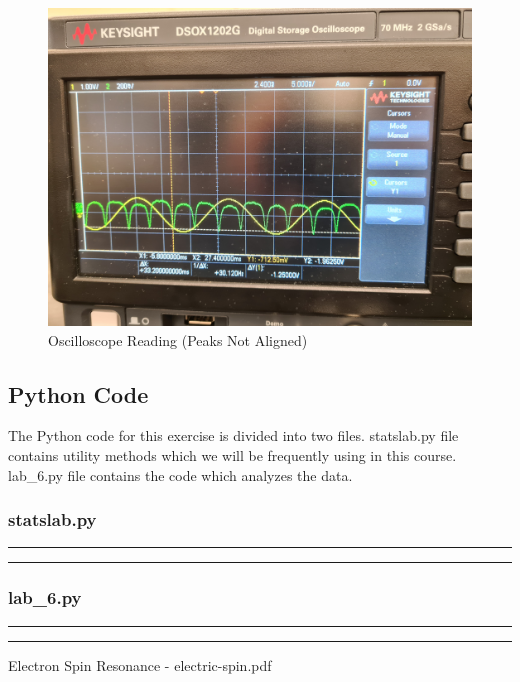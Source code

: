 \documentclass[letterpaper,12pt]{article}
\begin{document}
\begin{figure}[H]
  \centering
  \includegraphics[width=1.0\linewidth]{../Fredrik/osc-p-not-aligned.jpg}    
  \begin{center}
    \begin{center}   
    \end{center}  \end{center}
  \caption{Oscilloscope Reading (Peaks Not Aligned)}
  \label{osc}
\end{figure}

\pagebreak

\subsection{Python Code}

The Python code for this exercise is divided into two files. statslab.py file contains utility methods
which we will be frequently using in this course. lab\_6.py file contains the code which analyzes
the data.

\subsubsection{statslab.py}
\noindent\rule{\textwidth}{1pt}

\noindent\rule{\textwidth}{1pt}

\pagebreak

\subsubsection{lab\_6.py}
\noindent\rule{\textwidth}{1pt}

\noindent\rule{\textwidth}{1pt}

\pagebreak

\begin{thebibliography}{99}

 Electron Spin Resonance - electric-spin.pdf

\end{thebibliography}
\end{document}
